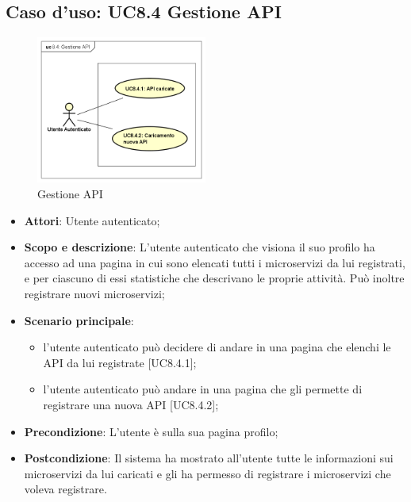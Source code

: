 \documentclass[12pt,a4paper,titlepage]{article}
\begin{document}
	\subsection{Caso d'uso: UC8.4 Gestione API}
	\label{UC8.4}
	\begin{figure}[H]
		\centering
		\includegraphics[width=0.5\textwidth]{UseCase/GestioneAPI}
		\caption{Gestione API}
	\end{figure}
	\begin{itemize}
		\item \textbf{Attori}: Utente autenticato;
		\item \textbf{Scopo e descrizione}: L'utente autenticato che visiona il suo profilo ha accesso ad una pagina in cui sono elencati tutti i microservizi da lui registrati, e per ciascuno di essi statistiche che descrivano le proprie attività. Può inoltre registrare nuovi microservizi;
		\item \textbf{Scenario principale}:
			\begin{itemize}
				\item l'utente autenticato può decidere di andare in una pagina che elenchi le API da lui registrate [UC8.4.1];
				\item l'utente autenticato può andare in una pagina che gli permette di registrare una nuova API [UC8.4.2];
			\end{itemize}
		\item \textbf{Precondizione}: L'utente è sulla sua pagina profilo;
		\item \textbf{Postcondizione}: Il sistema ha mostrato all'utente tutte le informazioni sui microservizi da lui caricati e gli ha permesso di registrare i microservizi che voleva registrare.
	\end{itemize}
\end{document}
